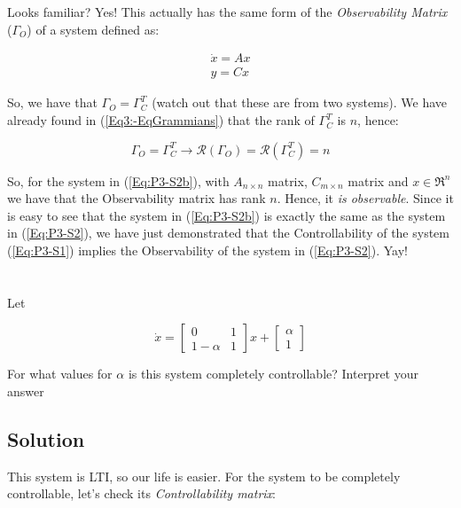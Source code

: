 \documentclass[10pt,a4paper]{article}
\begin{document}
Looks familiar? Yes! This actually has the same form of the \textit{Observability Matrix} ($\Gamma_{O}$) of a system defined as:

\begin{equation}
\begin{matrix}
\dot{x} = Ax \\
y = Cx
\end{matrix}
\label{Eq:P3-S2b}
\end{equation}

So, we have that $\Gamma_{O} = \Gamma^{T}_{C}$ (watch out that these are from two systems). We have already found in (\ref{Eq3:-EqGrammians}) that the rank of $\Gamma^{T}_{C}$ is $n$, hence:
 
\[ \Gamma_{O} = \Gamma^{T}_{C} \rightarrow \mathcal{R}( \Gamma_{O} ) = \mathcal{R}(\Gamma^{T}_{C}) = n \]

\begin{center}
\end{center}

So, for the system in (\ref{Eq:P3-S2b}), with $A_{n\times n}$ matrix, $C_{m \times n}$ matrix and $x \in \Re^{n} $ we have that the Observability matrix has rank $n$. Hence, it \textit{is observable}. Since it is easy to see that the system in (\ref{Eq:P3-S2b}) is exactly the same as the system in (\ref{Eq:P3-S2}), we have just demonstrated that the Controllability of the system (\ref{Eq:P3-S1}) implies the Observability of the system in (\ref{Eq:P3-S2}). Yay!


\section{}
Let

\[ \dot{x} = 
\begin{bmatrix}
0 & 1\\
1 - \alpha & 1
\end{bmatrix}
x + 
\begin{bmatrix}
\alpha \\
1
\end{bmatrix}
\]

For what values for $\alpha$ is this system completely controllable? Interpret your answer

\subsection*{Solution}
This system is LTI, so our life is easier. For the system to be completely controllable, let's check its \textit{Controllability matrix}:
\end{document}
